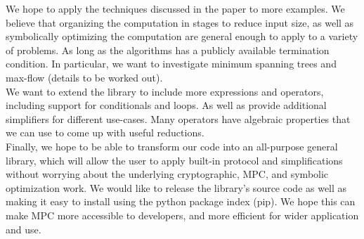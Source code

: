 We hope to apply the techniques discussed in the paper to more examples. We believe that organizing the computation in stages to reduce input size, as well as symbolically optimizing the computation are general enough to apply to a variety of problems. As long as the algorithms has a publicly available termination condition. In particular, we want to investigate minimum spanning trees and max-flow (details to be worked out). \\

We want to extend the library to include more expressions and operators, including support for conditionals and loops. As well as provide additional simplifiers for different use-cases. Many operators have algebraic properties that we can use to come up with useful reductions. \\

Finally, we hope to be able to transform our code into an all-purpose general library, which will allow the user to apply built-in protocol and simplifications without worrying about the underlying cryptographic, MPC, and symbolic optimization work. We would like to release the library's source code as well as making it easy to install using the python package index (pip). We hope this can make MPC more accessible to developers, and more efficient for wider application and use.
